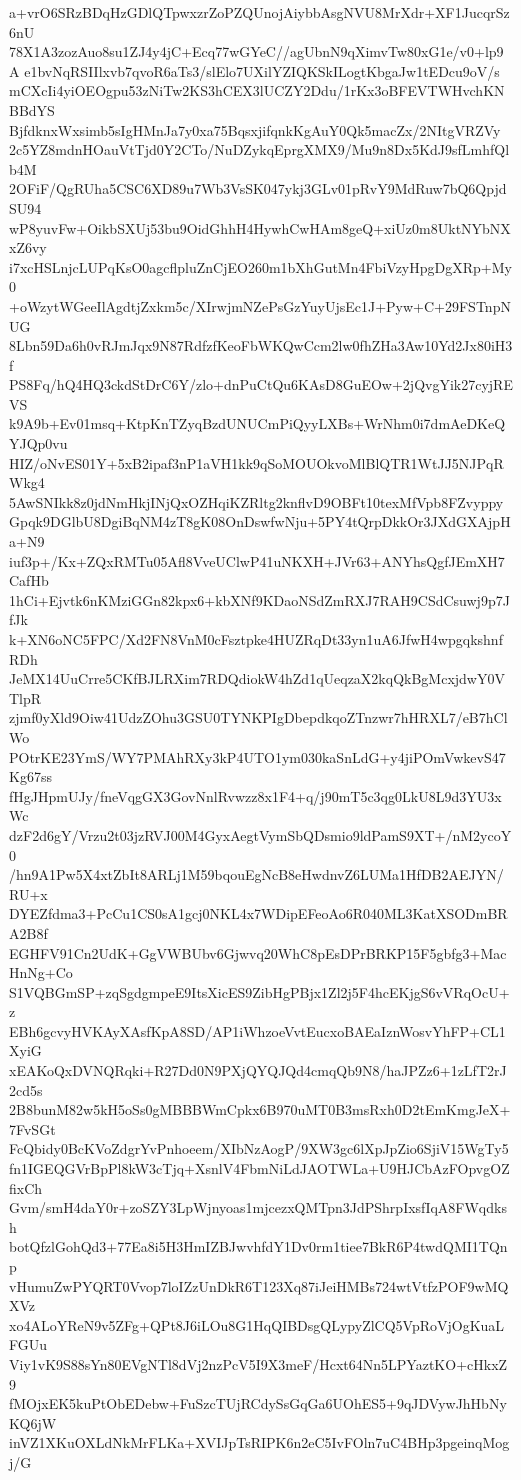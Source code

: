 a+vrO6SRzBDqHzGDlQTpwxzrZoPZQUnojAiybbAsgNVU8MrXdr+XF1JucqrSz6nU
78X1A3zozAuo8su1ZJ4y4jC+Ecq77wGYeC//agUbnN9qXimvTw80xG1e/v0+lp9A
e1bvNqRSIIlxvb7qvoR6aTs3/slElo7UXilYZIQKSkILogtKbgaJw1tEDcu9oV/s
mCXcIi4yiOEOgpu53zNiTw2KS3hCEX3lUCZY2Ddu/1rKx3oBFEVTWHvchKNBBdYS
BjfdknxWxsimb5sIgHMnJa7y0xa75BqsxjifqnkKgAuY0Qk5macZx/2NItgVRZVy
2c5YZ8mdnHOauVtTjd0Y2CTo/NuDZykqEprgXMX9/Mu9n8Dx5KdJ9sfLmhfQlb4M
2OFiF/QgRUha5CSC6XD89u7Wb3VsSK047ykj3GLv01pRvY9MdRuw7bQ6QpjdSU94
wP8yuvFw+OikbSXUj53bu9OidGhhH4HywhCwHAm8geQ+xiUz0m8UktNYbNXxZ6vy
i7xcHSLnjcLUPqKsO0agcflpluZnCjEO260m1bXhGutMn4FbiVzyHpgDgXRp+My0
+oWzytWGeeIlAgdtjZxkm5c/XIrwjmNZePsGzYuyUjsEc1J+Pyw+C+29FSTnpNUG
8Lbn59Da6h0vRJmJqx9N87RdfzfKeoFbWKQwCcm2lw0fhZHa3Aw10Yd2Jx80iH3f
PS8Fq/hQ4HQ3ckdStDrC6Y/zlo+dnPuCtQu6KAsD8GuEOw+2jQvgYik27cyjREVS
k9A9b+Ev01msq+KtpKnTZyqBzdUNUCmPiQyyLXBs+WrNhm0i7dmAeDKeQYJQp0vu
HIZ/oNvES01Y+5xB2ipaf3nP1aVH1kk9qSoMOUOkvoMlBlQTR1WtJJ5NJPqRWkg4
5AwSNIkk8z0jdNmHkjINjQxOZHqiKZRltg2knflvD9OBFt10texMfVpb8FZvyppy
Gpqk9DGlbU8DgiBqNM4zT8gK08OnDswfwNju+5PY4tQrpDkkOr3JXdGXAjpHa+N9
iuf3p+/Kx+ZQxRMTu05Afl8VveUClwP41uNKXH+JVr63+ANYhsQgfJEmXH7CafHb
1hCi+Ejvtk6nKMziGGn82kpx6+kbXNf9KDaoNSdZmRXJ7RAH9CSdCsuwj9p7JfJk
k+XN6oNC5FPC/Xd2FN8VnM0cFsztpke4HUZRqDt33yn1uA6JfwH4wpgqkshnfRDh
JeMX14UuCrre5CKfBJLRXim7RDQdiokW4hZd1qUeqzaX2kqQkBgMcxjdwY0VTlpR
zjmf0yXld9Oiw41UdzZOhu3GSU0TYNKPIgDbepdkqoZTnzwr7hHRXL7/eB7hClWo
POtrKE23YmS/WY7PMAhRXy3kP4UTO1ym030kaSnLdG+y4jiPOmVwkevS47Kg67ss
fHgJHpmUJy/fneVqgGX3GovNnlRvwzz8x1F4+q/j90mT5c3qg0LkU8L9d3YU3xWc
dzF2d6gY/Vrzu2t03jzRVJ00M4GyxAegtVymSbQDsmio9ldPamS9XT+/nM2ycoY0
/hn9A1Pw5X4xtZbIt8ARLj1M59bqouEgNcB8eHwdnvZ6LUMa1HfDB2AEJYN/RU+x
DYEZfdma3+PcCu1CS0sA1gcj0NKL4x7WDipEFeoAo6R040ML3KatXSODmBRA2B8f
EGHFV91Cn2UdK+GgVWBUbv6Gjwvq20WhC8pEsDPrBRKP15F5gbfg3+MacHnNg+Co
S1VQBGmSP+zqSgdgmpeE9ItsXicES9ZibHgPBjx1Zl2j5F4hcEKjgS6vVRqOcU+z
EBh6gcvyHVKAyXAsfKpA8SD/AP1iWhzoeVvtEucxoBAEaIznWosvYhFP+CL1XyiG
xEAKoQxDVNQRqki+R27Dd0N9PXjQYQJQd4cmqQb9N8/haJPZz6+1zLfT2rJ2cd5s
2B8bunM82w5kH5oSs0gMBBBWmCpkx6B970uMT0B3msRxh0D2tEmKmgJeX+7FvSGt
FcQbidy0BcKVoZdgrYvPnhoeem/XIbNzAogP/9XW3gc6lXpJpZio6SjiV15WgTy5
fn1IGEQGVrBpPl8kW3cTjq+XsnlV4FbmNiLdJAOTWLa+U9HJCbAzFOpvgOZfixCh
Gvm/smH4daY0r+zoSZY3LpWjnyoas1mjcezxQMTpn3JdPShrpIxsfIqA8FWqdksh
botQfzlGohQd3+77Ea8i5H3HmIZBJwvhfdY1Dv0rm1tiee7BkR6P4twdQMI1TQnp
vHumuZwPYQRT0Vvop7loIZzUnDkR6T123Xq87iJeiHMBs724wtVtfzPOF9wMQXVz
xo4ALoYReN9v5ZFg+QPt8J6iLOu8G1HqQIBDsgQLypyZlCQ5VpRoVjOgKuaLFGUu
Viy1vK9S88sYn80EVgNTl8dVj2nzPcV5I9X3meF/Hcxt64Nn5LPYaztKO+cHkxZ9
fMOjxEK5kuPtObEDebw+FuSzcTUjRCdySsGqGa6UOhES5+9qJDVywJhHbNyKQ6jW
inVZ1XKuOXLdNkMrFLKa+XVIJpTsRIPK6n2eC5IvFOln7uC4BHp3pgeinqMogj/G

